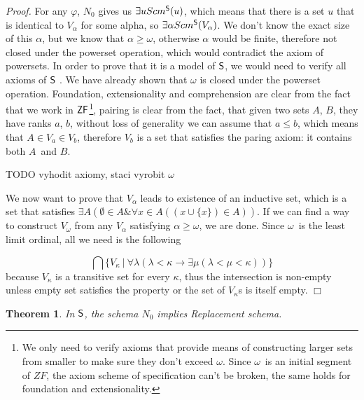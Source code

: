 \documentclass[12pt,a4paper]{article}
\newtheorem{theorem}{Theorem}[section]
\newenvironment{proof}
{\noindent \textit{Proof.}}
{\hspace*{\fill} $\Box$}
\newcommand{\then}{\rightarrow}
\begin{document}
\begin{proof}
For any $\varphi$, $N_0$ gives us $\exists u Scm^{\sf{S}}(u)$, which means that there is a set $u$ that is identical to $V_\alpha$ for some alpha, so $\exists \alpha Scm^{\sf{S}}(V_\alpha)$.
We don't know the exact size of this $\alpha$, but we know that $\alpha \geq \omega$, otherwise $\alpha$ would be finite, therefore not closed under the powerset operation, which would contradict the axiom of powersets. 
In order to prove that it is a model of $\sf{S}$, we would need to verify all axioms of $\sf{S}$ . We have already shown that $\omega$ is closed under the powerset operation. Foundation, extensionality and comprehension are clear from the fact that we work in $\sf{ZF}$\footnote{We only need to verify axioms that provide means of constructing larger sets from smaller to make sure they don't exceed $\omega$. Since $\omega$ is an initial segment of $ZF$, the axiom scheme of specification can't be broken, the same holds for foundation and extensionality.}, pairing is clear from the fact, that given two sets $A$, $B$, they have ranks $a$, $b$, without loss of generality we can assume that $a \leq b$, which means that $A \in V_a \in V_b$, therefore $V_b$ is a set that satisfies the paring axiom: it contains both $A$ and $B$.

TODO vyhodit axiomy, staci vyrobit $\omega$

We now want to prove that $V_\alpha$ leads to existence of an inductive set, which is a set that satisfies $\exists A(\emptyset \in A \& \forall  x \in A ((x \cup \{ x\}) \in A))$. If we can find a way to construct $V_\omega$ from any $V_\alpha$ satisfying $\alpha \geq \omega$, we are done. Since $\omega$ is the least limit ordinal, all we need is the following

\begin{equation}
\bigcap \{V_\kappa\ |\  \forall \lambda(\lambda < \kappa \then \exists \mu(\lambda < \mu < \kappa))\}
\end{equation}
because $V_\kappa$ is a transitive set for every $\kappa$, thus the intersection is non-empty unless empty set satisfies the property or the set of $V_\kappa$s is itself empty.
\end{proof}


\begin{theorem}
In $\sf{S}$, the schema $N_0$ implies Replacement schema.
\end{theorem}
\end{document}
